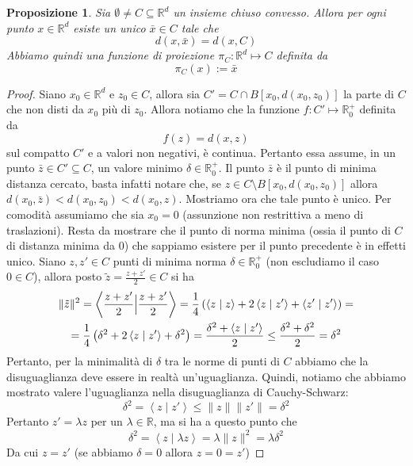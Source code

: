 \documentclass[a4paper,12pt,italian]{article}
\newcommand{\Rd}{\mathbb{R}^d}
\newtheorem{prop}{Proposizione}
\begin{document}
\begin{prop}	
Sia $\emptyset\neq C\subseteq\Rd$ un insieme chiuso convesso. Allora per ogni punto $x\in\Rd$ esiste un unico $\bar{x}\in C$ tale che
\begin{equation}
d(x,\bar{x})=d(x,C)
\end{equation}
Abbiamo quindi una funzione di proiezione $\pi_C:\Rd\mapsto C$ definita da
\begin{equation}
\pi_C(x):=\bar{x}
\end{equation}
\end{prop}
\begin{proof}
Siano $x_0\in\Rd$ e $z_0\in C$, allora sia $C'=C\cap B[x_0,d(x_0,z_0)]$ la parte di $C$ che non disti da $x_0$ pi\`u di $z_0$. Allora notiamo
che la funzione $f:C'\mapsto\mathbb{R}^+_0$ definita da
\begin{equation}
f(z)=d(x,z)
\end{equation}
sul compatto $C'$ e a valori non negativi, \`e continua. Pertanto essa assume, in un punto $\bar{z}\in C'\subseteq C$, un valore minimo
$\delta\in\mathbb{R}^+_0$.
Il punto $\bar{z}$ \`e il punto di minima distanza cercato, basta infatti notare che, se $z\in C\setminus B[x_0,d(x_0,z_0)]$ allora
$d(x_0,\bar{z})<d(x_0,z_0)<d(x_0,z)$.
Mostriamo ora che tale punto \`e unico. Per comodit\`a assumiamo che sia $x_0=0$ (assunzione non restrittiva a meno di traslazioni).
Resta da mostrare che il punto di norma minima (ossia il punto di $C$ di distanza minima da $0$) 
che sappiamo esistere per il punto precedente \`e in effetti unico.
Siano $z,z'\in C$ punti di minima norma $\delta\in\mathbb{R}^+_0$ (non escludiamo il caso $0\in C$), allora posto
$\tilde{z}=\frac{z+z'}{2}\in C$ si ha
\begin{gather}				%
\|\tilde{z}\|^2=\left<\frac{z+z'}{2}\Big{|}\frac{z+z'}{2}\right>=\frac{1}{4}\left(\left<z\mid z\right>+2\left<z\mid z'\right>+
\left<z'\mid z'\right>\right)=\\
=\frac{1}{4}\left(\delta^2+2\left<z\mid z'\right>+\delta^2\right)=\frac{\delta^2+\left<z\mid z'\right>}{2}\leq\frac{\delta^2+\delta^2}{2}=\delta^2
\end{gather}
Pertanto, per la minimalit\`a di $\delta$ tra le norme di punti di $C$ abbiamo che la disuguaglianza deve essere in realt\`a un'uguaglianza.
Quindi, notiamo che abbiamo mostrato valere l'uguaglianza nella disuguaglianza di Cauchy-Schwarz:
\begin{equation}
\delta^2=\left<z\mid z'\right>\leq\|z\|\|z'\|=\delta^2
\end{equation}
Pertanto $z'=\lambda z$ per un $\lambda\in\mathbb{R}$, ma si ha a questo punto che
\begin{equation}
\delta^2=\left<z\mid\lambda z\right>=\lambda\|z\|^2=\lambda\delta^2
\end{equation}
Da cui $z=z'$ (se abbiamo $\delta=0$ allora $z=0=z'$)
\end{proof}
\end{document}
